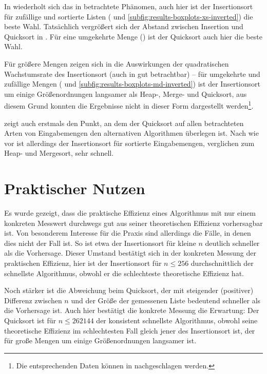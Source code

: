 

In  wiederholt sich das in  betrachtete Phänomen, auch hier ist der Insertionsort für zufällige und sortierte Listen ( und \ref{subfig:results-boxplots-xs-inverted}) die beste Wahl. Tatsächlich vergrößert sich der Abstand zwischen Insertion und Quicksort in . Für eine umgekehrte Menge () ist der Quicksort auch hier die beste Wahl.



Für größere Mengen zeigen sich in  die Auswirkungen der quadratischen Wachstumsrate des Insertionsort (auch in  gut betrachtbar) -- für umgekehrte und zufällige Mengen ( und \ref{subfig:results-boxplots-md-inverted}) ist der Insertionsort um einige Größenordnungen langsamer als Heap-, Merge- und Quicksort, aus diesem Grund konnten die Ergebnisse nicht in dieser Form dargestellt werden\footnote{Die entsprechenden Daten können in  nachgeschlagen werden.}.

 zeigt auch erstmals den Punkt, an dem der Quicksort auf allen betrachteten Arten von Eingabemengen den alternativen Algorithmen überlegen ist. Nach wie vor ist allerdings der Insertionsort für sortierte Eingabemengen, verglichen zum Heap- und Mergesort, sehr schnell.

\pagebreak[3]
\section{Praktischer Nutzen}

Es wurde gezeigt, dass die praktische Effizienz eines Algorithmus mit nur einem konkreten Messwert durchwegs gut aus seiner theoretischen Effizienz vorhersagbar ist. Von besonderem Interesse für die Praxis sind allerdings die Fälle, in denen dies nicht der Fall ist. So ist etwa der Insertionsort für kleine $n$ deutlich schneller als die Vorhersage. Dieser Umstand bestätigt sich in der konkreten Messung der praktischen Effizienz, hier ist der Insertionsort für $n \leq 256$ durchschnittlich der schnellste Algorithmus, obwohl er die schlechteste theoretische Effizienz hat.

Noch stärker ist die Abweichung beim Quicksort, der mit steigender (positiver) Differenz zwischen $n$ und der Größe der gemessenen Liste bedeutend schneller als die Vorhersage ist. Auch hier bestätigt die konkrete Messung die Erwartung: Der Quicksort ist für $n \leq 262144$ der konsistent schnellste Algorithmus, obwohl seine theoretische Effizienz im schlechtesten Fall gleich jener des Insertionsort ist, der für große Mengen um einige Größenordnungen langsamer ist.

